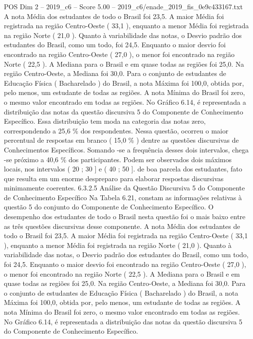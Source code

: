 \begin{textsample}{POS Dim 2 – 2019\_c6 – Score 5.00 – 2019\_c6/enade\_2019\_fis\_0e9c433167.txt}
A nota Média dos estudantes de todo o Brasil foi 23,5.
A maior Média foi registrada na região Centro-Oeste ( 33,1 ), enquanto a menor Média foi registrada na região Norte ( 21,0 ).
Quanto à variabilidade das notas, o Desvio padrão dos estudantes do Brasil, como um todo, foi 24,5.
Enquanto o maior desvio foi encontrado na região Centro-Oeste ( 27,0 ), o menor foi encontrado na região Norte ( 22,5 ).
A Mediana para o Brasil e em quase todas as regiões foi 25,0.
Na região Centro-Oeste, a Mediana foi 30,0.
Para o conjunto de estudantes de Educação Física ( Bacharelado ) do Brasil, a nota Máxima foi 100,0, obtida por, pelo menos, um estudante de todas as regiões.
A nota Mínima do Brasil foi zero, o mesmo valor encontrado em todas as regiões.
No Gráfico 6.14, é representada a distribuição das notas da questão discursiva 5 do Componente de Conhecimento Específico.
Essa distribuição tem moda na categoria das notas zero, correspondendo a 25,6 \% dos respondentes.
Nessa questão, ocorreu o maior percentual de respostas em branco ( 15,0 \% ) dentre as questões discursivas de Conhecimentos Específicos.
Somando -se a frequência desses dois intervalos, chega -se próximo a 40,6 \% dos participantes.
Podem ser observados dois máximos locais, nos intervalos ( 20 ; 30 ] e ( 40 ; 50 ]. de boa parcela dos estudantes, fato que resulta em um enorme despreparo para elaborar respostas discursivas minimamente coerentes. 6.3.2.5 Análise da Questão Discursiva 5 do Componente de Conhecimento Específico Na Tabela 6.21, constam as informações relativas à questão 5 do conjunto do Componente de Conhecimento Específico.
O desempenho dos estudantes de todo o Brasil nesta questão foi o mais baixo entre as três questões discursivas desse componente.
A nota Média dos estudantes de todo o Brasil foi 23,5.
A maior Média foi registrada na região Centro-Oeste ( 33,1 ), enquanto a menor Média foi registrada na região Norte ( 21,0 ).
Quanto à variabilidade das notas, o Desvio padrão dos estudantes do Brasil, como um todo, foi 24,5.
Enquanto o maior desvio foi encontrado na região Centro-Oeste ( 27,0 ), o menor foi encontrado na região Norte ( 22,5 ).
A Mediana para o Brasil e em quase todas as regiões foi 25,0.
Na região Centro-Oeste, a Mediana foi 30,0.
Para o conjunto de estudantes de Educação Física ( Bacharelado ) do Brasil, a nota Máxima foi 100,0, obtida por, pelo menos, um estudante de todas as regiões.
A nota Mínima do Brasil foi zero, o mesmo valor encontrado em todas as regiões.
No Gráfico 6.14, é representada a distribuição das notas da questão discursiva 5 do Componente de Conhecimento Específico.

\end{textsample}
